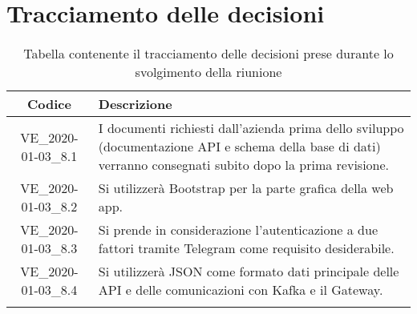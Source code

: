 \section*{Tracciamento delle decisioni}

\begin{center}
	\begin{longtable}{|c|p{12.25cm}|}
	\hline
	\rowcolor{lighter-grayer}
	\textbf{Codice} & \textbf{Descrizione} \\
	\hline
	\endfirsthead
	
	\hline
	VE\_2020-01-03\_8.1 & I documenti richiesti dall'azienda prima dello sviluppo (documentazione API e schema della base di dati) verranno consegnati subito dopo la prima revisione. \\
	\hline
	VE\_2020-01-03\_8.2 & Si utilizzerà Bootstrap per la parte grafica della web app. \\
	\hline
	VE\_2020-01-03\_8.3 & Si prende in considerazione l'autenticazione a due fattori tramite Telegram come requisito desiderabile. \\
	\hline
	VE\_2020-01-03\_8.4 & Si utilizzerà JSON come formato dati principale delle API e delle comunicazioni con Kafka e il Gateway. \\
	\hline
	\caption{Tabella contenente il tracciamento delle decisioni prese durante lo svolgimento della riunione}
	\end{longtable}
\end{center}